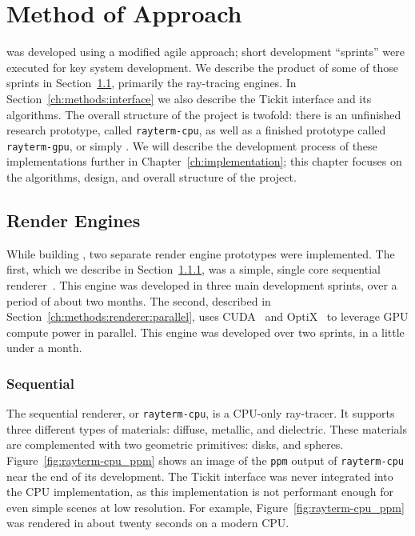 %
%
%
\chapter{Method of Approach}
\label{ch:methods}

 \name{} was developed using a modified agile approach; short development ``sprints'' were executed for key system development.
We describe the product of some of those sprints in Section~\ref{ch:methods:renderer}, primarily the ray-tracing engines.
In Section~\ref{ch:methods:interface} we also describe the Tickit interface and its algorithms.
The overall structure of the project is twofold: there is an unfinished research prototype, called \texttt{rayterm-cpu}, as well as a finished prototype called \texttt{rayterm-gpu}, or simply \name{}.
We will describe the development process of these implementations further in Chapter~\ref{ch:implementation}; this chapter focuses on the algorithms, design, and overall structure of the project.


\section{Render Engines}
\label{ch:methods:renderer}
While building \name{}, two separate render engine prototypes were implemented.
The first, which we describe in Section~\ref{ch:methods:renderer:sequential}, was a simple, single core sequential renderer~\cite{raytermCpuImpl}.
This engine was developed in three main development sprints, over a period of about two months.
The second, described in Section~\ref{ch:methods:renderer:parallel}, uses CUDA~\cite{nvidia2011cuda} and OptiX~\cite{parker2010optix} to leverage GPU compute power in parallel.
This engine was developed over two sprints, in a little under a month.


\subsection{Sequential}
\label{ch:methods:renderer:sequential}

The sequential renderer, or \texttt{rayterm-cpu}, is a CPU-only ray-tracer.
It supports three different types of materials: diffuse, metallic, and dielectric.
These materials are complemented with two geometric primitives: disks, and spheres.
Figure~\ref{fig:rayterm-cpu_ppm} shows an image of the \texttt{ppm} output of \texttt{rayterm-cpu} near the end of its development.
The Tickit interface was never integrated into the CPU implementation, as this implementation is not performant enough for even simple scenes at low resolution.
For example, Figure~\ref{fig:rayterm-cpu_ppm} was rendered in about twenty seconds on a modern CPU.

